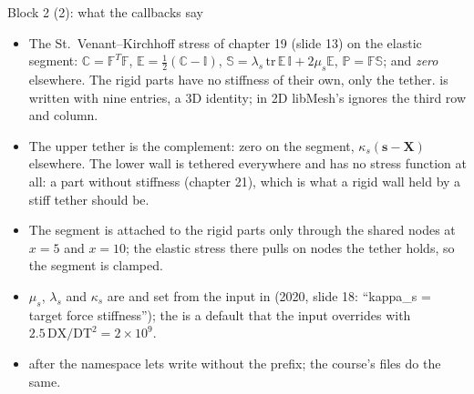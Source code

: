 \documentclass[aspectratio=169,11pt]{beamer}
\begin{document}
\begin{frame}{Block 2 (2): what the callbacks say}
\label{fr:model2}
\footnotesize
\begin{itemize}
  \item The St.\ Venant--Kirchhoff stress of chapter 19 (slide 13) on the elastic segment: $\mathbb{C} = \mathbb{F}^T\mathbb{F}$, $\mathbb{E} = \tfrac12(\mathbb{C} - \mathbb{I})$, $\mathbb{S} = \lambda_s\,\mathrm{tr}\,\mathbb{E}\,\mathbb{I} + 2\mu_s\mathbb{E}$, $\mathbb{P} = \mathbb{F}\mathbb{S}$; and \emph{zero} elsewhere. The rigid parts have no stiffness of their own, only the tether.  is written with nine entries, a 3D identity; in 2D libMesh's  ignores the third row and column.
  \item The upper tether is the complement: zero on the segment, $\kappa_s(\mathbf{s} - \mathbf{X})$ elsewhere. The lower wall is tethered everywhere and has no stress function at all: a part without stiffness (chapter 21), which is what a rigid wall held by a stiff tether should be.
  \item The segment is attached to the rigid parts only through the shared nodes at $x = 5$ and $x = 10$; the elastic stress there pulls on nodes the tether holds, so the segment is clamped.
  \item $\mu_s$, $\lambda_s$ and $\kappa_s$ are  and set from the input in  (2020, slide 18: ``kappa\_s = target force stiffness''); the  is a default that the input overrides with $2.5\,\mathrm{DX}/\mathrm{DT}^2 = 2\times10^9$.
  \item {} after the namespace lets  write  without the prefix; the course's files do the same.
\end{itemize}
\end{frame}
\end{document}
